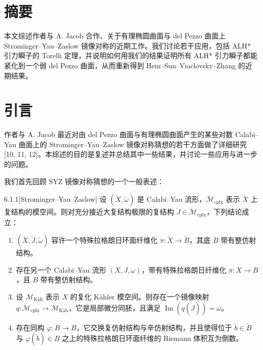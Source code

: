 \section*{摘要}
本文综述作者与 A. Jacob 合作、关于有理椭圆曲面与 del Pezzo 曲面上 Strominger--Yau--Zaslow 镜像对称的近期工作。我们讨论若干应用，包括 ALH* 引力瞬子的 Torelli 定理，并说明如何用我们的结果证明所有 ALH* 引力瞬子都能紧化到一个弱 del Pezzo 曲面，从而重新得到 Hein--Sun--Viaclovsky--Zhang 的近期结果。

\section{引言}
作者与 A. Jacob 最近对由 del Pezzo 曲面与有理椭圆曲面产生的某些对数 Calabi--Yau 曲面上的 Strominger--Yau--Zaslow 镜像对称猜想的若干方面做了详细研究 [10, 11, 12]。本综述的目的是复述并总结其中一些结果，并讨论一些应用与进一步的问题。

我们首先回顾 SYZ 镜像对称猜想的一个一般表述：

\begin{conjecture}{6.1.1}[Strominger--Yau--Zaslow]
设 $(\check X,\check\omega)$ 是 Calabi--Yau 流形，$\check{\mathcal{M}}_{\mathrm{cplx}}$ 表示 $\check X$ 上复结构的模空间。则对充分接近大复结构极限的复结构 $\check J\in\check{\mathcal{M}}_{\mathrm{cplx}}$，下列结论成立：
\begin{enumerate}
\item[(1)] $(\check X,\check J,\check\omega)$ 容许一个特殊拉格朗日环面纤维化 $\check\pi:\check X\to\check B$，其底 $\check B$ 带有整仿射结构。
\item[(2)] 存在另一个 Calabi--Yau 流形 $(X,J,\omega)$，带有特殊拉格朗日纤维化 $\pi:X\to B$，且 $B$ 带有整仿射结构。
\item[(3)] 设 $\mathcal{M}_{\mathrm{Käh}}$ 表示 $X$ 的复化 Kähler 模空间。则存在一个镜像映射 $q:\check{\mathcal{M}}_{\mathrm{cplx}}\to\mathcal{M}_{\mathrm{Käh}}$，它是局部微分同胚，且满足 $\operatorname{Im}(q(\check J))=\omega$。
\item[(4)] 存在同构 $\varphi:\check B\to B$，它交换复仿射结构与辛仿射结构，并且使得位于 $\check b\in\check B$ 与 $\varphi(\check b)\in B$ 之上的特殊拉格朗日环面纤维的 Riemann 体积互为倒数。
\end{enumerate}
\end{conjecture}

